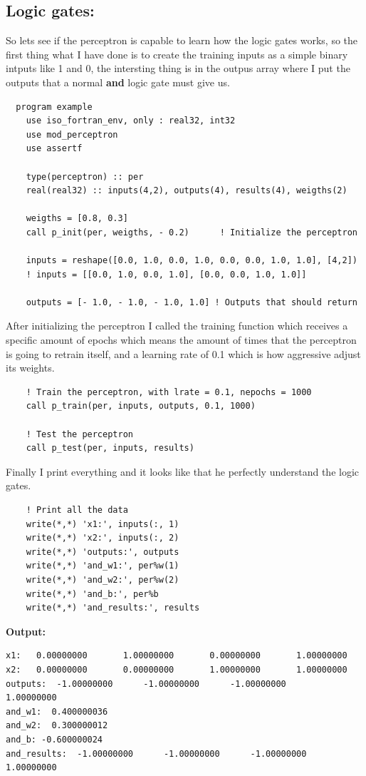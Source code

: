 \documentclass[12pt]{article}
\begin{document}
\subsection{Logic gates:}
So lets see if the perceptron is capable to learn how the logic gates works, so the first
thing what I have done is to create the training inputs as a simple binary intputs like 1 and 0,
the intersting thing is in the outpus array where I put the outputs that a normal \textbf{and} logic gate
must give us.
\begin{lstlisting}
  program example
    use iso_fortran_env, only : real32, int32
    use mod_perceptron
    use assertf

    type(perceptron) :: per
    real(real32) :: inputs(4,2), outputs(4), results(4), weigths(2)

    weigths = [0.8, 0.3]
    call p_init(per, weigths, - 0.2)      ! Initialize the perceptron

    inputs = reshape([0.0, 1.0, 0.0, 1.0, 0.0, 0.0, 1.0, 1.0], [4,2])
    ! inputs = [[0.0, 1.0, 0.0, 1.0], [0.0, 0.0, 1.0, 1.0]]

    outputs = [- 1.0, - 1.0, - 1.0, 1.0] ! Outputs that should return

\end{lstlisting}
After initializing the perceptron I called the training function which receives a specific
amount of epochs which means the amount of times that the perceptron is going to retrain itself,
and a learning rate of 0.1 which is how aggressive adjust its weights.
\begin{lstlisting}
    ! Train the perceptron, with lrate = 0.1, nepochs = 1000
    call p_train(per, inputs, outputs, 0.1, 1000)

    ! Test the perceptron
    call p_test(per, inputs, results)
\end{lstlisting}
Finally I print everything and it looks like that he perfectly understand the logic gates.
\begin{lstlisting}
    ! Print all the data
    write(*,*) 'x1:', inputs(:, 1)
    write(*,*) 'x2:', inputs(:, 2)
    write(*,*) 'outputs:', outputs
    write(*,*) 'and_w1:', per%w(1)
    write(*,*) 'and_w2:', per%w(2)
    write(*,*) 'and_b:', per%b
    write(*,*) 'and_results:', results
\end{lstlisting}
\textbf{Output:}
\begin{verbatim}
x1:   0.00000000       1.00000000       0.00000000       1.00000000    
x2:   0.00000000       0.00000000       1.00000000       1.00000000    
outputs:  -1.00000000      -1.00000000      -1.00000000       1.00000000    
and_w1:  0.400000036    
and_w2:  0.300000012    
and_b: -0.600000024    
and_results:  -1.00000000      -1.00000000      -1.00000000       1.00000000
\end{verbatim}
\end{document}
